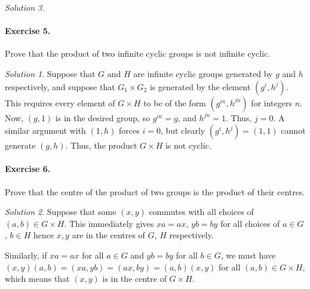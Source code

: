 \documentclass[11pt]{report}
\theoremstyle{remark}
\newtheorem*{solution}{Solution}
\begin{document}
\begin{solution}
    \paragraph{Exercise 5.} Prove that the product of two infinite cyclic groups is
    not infinite cyclic.
    \begin{solution}
        Suppose that $G$ and $H$ are infinite cyclic groups generated by $g$
        and $h$ respectively, and suppose that $G_1 \times G_2$ is generated by
        the element $(g^i, h^j)$. This requires every element of $G\times H$ to be
        of the form $(g^{in}, h^{jn})$ for integers $n$. Now, $(g, 1)$ is in the
        desired group, so $g^{in} = g$, and $h^{jn} = 1$. Thus, $j = 0$. A similar
        argument with $(1, h)$ forces $i = 0$, but clearly $(g^i, h^j) = (1, 1)$
        cannot generate $(g, h)$. Thus, the product $G\times H$ is not cyclic.
    \end{solution}
    
    \paragraph{Exercise 6.} Prove that the centre of the product of two groups is
    the product of their centres.
    \begin{solution}
        Suppose that some $(x, y)$ commutes with all choices of $(a, b) \in G\times
        H$. This immediately gives $xa = ax$, $yb = by$ for all choices of $a \in
        G$, $b \in H$ hence $x, y$ are in the centres of $G$, $H$ respectively.

        Similarly, if $xa = ax$ for all $a \in G$ and $yb = by$ for all $b \in G$,
        we must have $(x, y)(a, b) = (xa, yb) = (ax, by) = (a, b)(x, y)$ for all
        $(a, b) \in G\times H$, which means that $(x, y)$ is in the centre of
        $G\times H$.
    \end{solution}
    

\end{solution}
\end{document}
